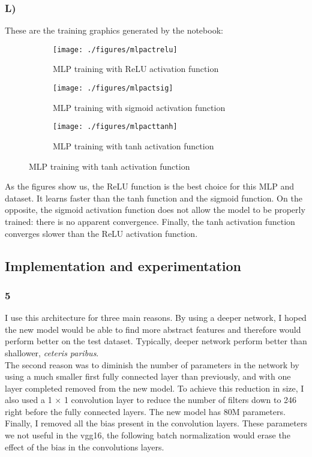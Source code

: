 \documentclass[12pt]{article}
\theoremstyle{definition}
\begin{document}
\subsubsection*{L)} These are the training graphics generated by the notebook:
\begin{figure}[H]
     \centering
     \begin{subfigure}[b]{0.3\textwidth}
         \centering
         \texttt{[image: ./figures/mlpactrelu]}
         \caption{MLP training with ReLU activation function}
     \end{subfigure}
     \hfill
     \begin{subfigure}[b]{0.3\textwidth}
         \centering
         \texttt{[image: ./figures/mlpactsig]}
         \caption{MLP training with sigmoid activation function}
     \end{subfigure}
     \hfill
     \begin{subfigure}[b]{0.3\textwidth}
         \centering
         \texttt{[image: ./figures/mlpacttanh]}
         \caption{MLP training with tanh activation function}
     \end{subfigure}
\end{figure}
As the figures show us, the ReLU function is the best choice for this MLP and
dataset. It learns faster than the tanh function and the sigmoid function. On
the opposite, the sigmoid activation function does not allow the model to be
properly trained: there is no apparent convergence. Finally, the tanh activation
function converges slower than the ReLU activation function.

\subsection{Implementation and experimentation}
\subsubsection*{5}
I use this architecture for three main reasons. By using a deeper network, I
hoped the new model would be able to find more abstract features and therefore
would perform better on the test dataset. Typically, deeper network perform
better than shallower, \textit{ceteris paribus}.
\\
The second reason was to diminish the number of parameters in the network by
using a much smaller first fully connected layer than previously, and with one
layer completed removed from the new model.  To achieve this reduction in size,
I also used a 1 $\times$ 1 convolution layer to reduce the number of filters down to
246 right before the fully connected layers. The new model has 80M parameters.
\\
Finally, I removed all the bias present in the convolution layers. These
parameters we not useful in the vgg16, the following batch normalization would
erase the effect of the bias in the convolutions layers.
\end{document}
